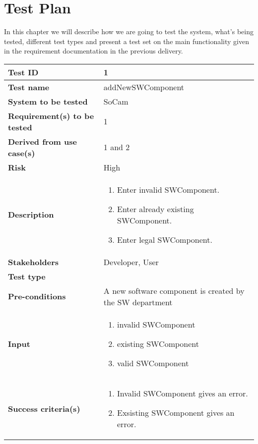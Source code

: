 \chapter{Test Plan}
\label{chp:testplan}

In this chapter we will describe how we are going to test the system, what's being tested, different test types and present a test set on the main functionality given in the requirement documentation in the previous delivery.  
\clearpage

		\begin{table}[H]
			\begin{tabular}{| p{4cm} | p{10cm} |}
			\hline
			\rowcolor{gray}
				{\bf Test ID} & 1 \\ \hline
				{\bf Test name} & addNewSWComponent \\ \hline
				{\bf System to be tested} & SoCam \\ \hline
				{\bf Requirement(s) to be tested} & 1 \\ \hline
				{\bf Derived from use case(s)} & 1 and 2 \\ \hline
				{\bf Risk} & High \\ \hline
				{\bf Description} & 
					\begin{enumerate}
						\item Enter invalid SWComponent.
						\item Enter already existing SWComponent.
						\item Enter legal SWComponent.
					\end{enumerate}
				\\ \hline
				{\bf Stakeholders} & Developer, User \\ \hline
				{\bf Test type} & \\ \hline
				{\bf Pre-conditions} & A new software component is created by the 
				SW department\\ \hline
				{\bf Input} & 
					\begin{enumerate}
						\item invalid SWComponent
						\item existing SWComponent
						\item valid SWComponent
					\end{enumerate}
				\\ \hline
				{\bf Success criteria(s)} & 
					\begin{enumerate}
						\item Invalid SWComponent gives an error.
						\item Exsisting SWComponent gives an error.

\end{enumerate}
\end{tabular}
\end{table}

